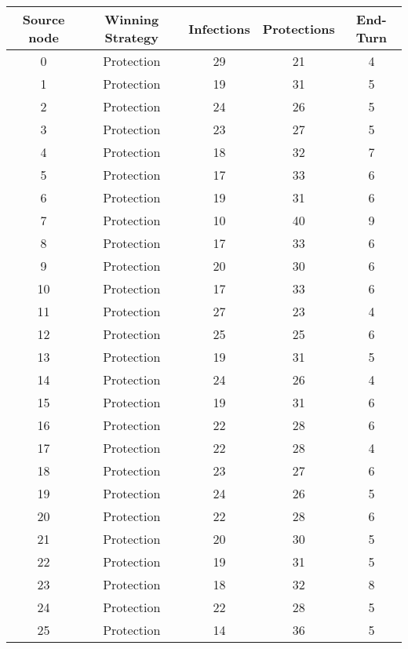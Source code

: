\documentclass[results.tex]{subfiles}
\begin{document}
\begin{center}
  \begin{tabular}{| c || c | c | c | c |}
    \hline
    {\bfseries Source node} & {\bfseries Winning Strategy} & {\bfseries Infections} & {\bfseries Protections} & {\bfseries End-Turn} \\  %
    \hline\hline
    0 & Protection & 29 & 21 & 4 \\ 
    \hline
    1 & Protection & 19 & 31 & 5 \\ 
    \hline
    2 & Protection & 24 & 26 & 5 \\ 
    \hline
    3 & Protection & 23 & 27 & 5 \\ 
    \hline
    4 & Protection & 18 & 32 & 7 \\ 
    \hline
    5 & Protection & 17 & 33 & 6 \\ 
    \hline
    6 & Protection & 19 & 31 & 6 \\ 
    \hline
    7 & Protection & 10 & 40 & 9 \\ 
    \hline
    8 & Protection & 17 & 33 & 6 \\ 
    \hline
    9 & Protection & 20 & 30 & 6 \\ 
    \hline
    10 & Protection & 17 & 33 & 6 \\ 
    \hline
    11 & Protection & 27 & 23 & 4 \\ 
    \hline
    12 & Protection & 25 & 25 & 6 \\ 
    \hline
    13 & Protection & 19 & 31 & 5 \\ 
    \hline
    14 & Protection & 24 & 26 & 4 \\ 
    \hline
    15 & Protection & 19 & 31 & 6 \\ 
    \hline
    16 & Protection & 22 & 28 & 6 \\ 
    \hline
    17 & Protection & 22 & 28 & 4 \\ 
    \hline
    18 & Protection & 23 & 27 & 6 \\ 
    \hline
    19 & Protection & 24 & 26 & 5 \\ 
    \hline
    20 & Protection & 22 & 28 & 6 \\ 
    \hline
    21 & Protection & 20 & 30 & 5 \\ 
    \hline
    22 & Protection & 19 & 31 & 5 \\ 
    \hline
    23 & Protection & 18 & 32 & 8 \\ 
    \hline
    24 & Protection & 22 & 28 & 5 \\ 
    \hline
    25 & Protection & 14 & 36 & 5 \\ 

\end{tabular}
\end{center}
\end{document}
